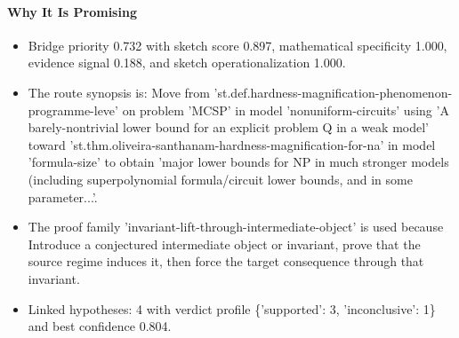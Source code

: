 \documentclass[11pt]{article}
\begin{document}
\paragraph{Why It Is Promising}
\begin{itemize}[leftmargin=*,itemsep=0.2em]
\item Bridge priority 0.732 with sketch score 0.897, mathematical specificity 1.000, evidence signal 0.188, and sketch operationalization 1.000.
\item The route synopsis is: Move from 'st.def.hardness-magnification-phenomenon-programme-leve' on problem 'MCSP' in model 'nonuniform-circuits' using 'A barely-nontrivial lower bound for an explicit problem Q in a weak model' toward 'st.thm.oliveira-santhanam-hardness-magnification-for-na' in model 'formula-size' to obtain 'major lower bounds for NP in much stronger models (including superpolynomial formula/circuit lower bounds, and in some parameter...'.
\item The proof family 'invariant-lift-through-intermediate-object' is used because Introduce a conjectured intermediate object or invariant, prove that the source regime induces it, then force the target consequence through that invariant.
\item Linked hypotheses: 4 with verdict profile \{'supported': 3, 'inconclusive': 1\} and best confidence 0.804.
\end{itemize}
\end{document}
